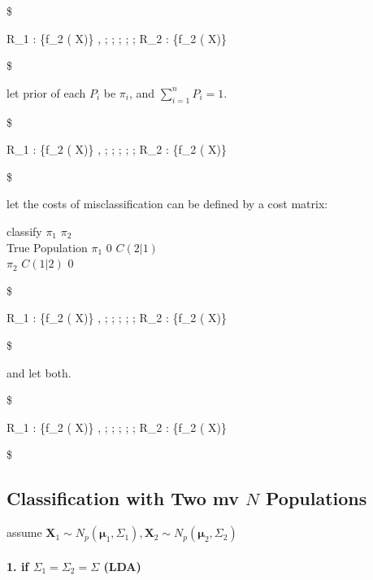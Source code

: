 \documentclass[
]{book}
\begin{document}
{{{\$

R\_1 :  \{f\_2 ( \pmb X)\} , ; ; ; ; ; R\_2 :  \{f\_2 ( \pmb X)\}  

\$

let prior of each \(P_i\) be \(\pi_i\), and \(\sum_{i=1}^n P_i = 1\).

\$

R\_1 :  \{f\_2 ( \pmb X)\} \ge {}, ; ; ; ; ; R\_2 :  \{f\_2 ( \pmb X)\} \le {} 

\$

let the costs of misclassification can be defined by a cost matrix:

\textbar{} classify \(\pi_1\)\textbar{} \(\pi_2\) \textbar{}\\
True Population \(\pi_1\) \textbar{} 0 \textbar{} \(C(2 \vert 1)\) \textbar{}\\
\(\pi_2\) \textbar{} \(C(1 \vert 2)\) \textbar{} 0 \textbar{}

\$

R\_1 :  \{f\_2 ( \pmb X)\} \ge {}, ; ; ; ; ; R\_2 :  \{f\_2 ( \pmb X)\} \le {} 

\$

and let both.

\$

R\_1 :  \{f\_2 ( \pmb X)\} \ge  {} \ast {}, ; ; ; ; ; R\_2 :  \{f\_2 ( \pmb X)\} \le  {} \ast {} 

\$

\hypertarget{classification-with-two-mv-n-populations}{%
\subsection{\texorpdfstring{Classification with Two mv \(N\) Populations}{Classification with Two mv N Populations}}\label{classification-with-two-mv-n-populations}}

assume \(\pmb X_1 \sim N_p( \pmb \mu_1 , \Sigma_1), \pmb X_2 \sim N_p( \pmb \mu_2 , \Sigma_2)\)

\hypertarget{if-sigma_1-sigma_2-sigma-lda}{%
\paragraph{\texorpdfstring{1. if \(\Sigma_1 = \Sigma_2 = \Sigma\) (LDA)}{1. if \textbackslash Sigma\_1 = \textbackslash Sigma\_2 = \textbackslash Sigma (LDA)}}\label{if-sigma_1-sigma_2-sigma-lda}}

}}}
\end{document}
